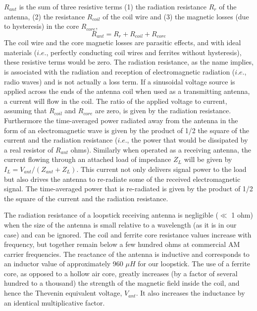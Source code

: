 \documentclass[utf8]{article}
\begin{document}
{	$R_{ant}$ is the sum of three resistive terms (1) the radiation resistance $R_r$ of the antenna, (2) the resistance $R_{coil}$ of the coil wire and (3) the magnetic losses (due to hysteresis) in the core $R_{core}$,
	$$R_{ant} = R_r + R_{coil} + R_{core}$$
	The coil wire and the core magnetic losses are parasitic effects, and with ideal materials ($i.e.$, perfectly conducting coil wires and ferrites without hysteresis), these resistive terms would be zero. The radiation resistance, as the name implies, is associated with the radiation and reception of electromagnetic radiation ($i.e.$, radio waves) and is not actually a loss term. If a sinusoidal voltage source is applied across the ends of the antenna coil when used as a transmitting antenna, a current will flow in the coil. The ratio of the applied voltage to current, assuming that $R_{coil}$ and $R_{core}$ are zero, is given by the radiation resistance. Furthermore the time-averaged power radiated away from the antenna in the form of an electromagnetic wave is given by the product of 1/2 the square of the current and the radiation resistance ($i.e.$, the power that would be dissipated by a real resistor of $R_{ant}$ ohms). Similarly when operated as a receiving antenna, the current flowing through an attached load of impedance $Z_L$ will be given by $I_L = V_{ant}/(Z_{ant} +Z_L )$. This current not only delivers signal power to the load but also drives the antenna to re-radiate some of the received electromagnetic signal. The time-averaged power that is re-radiated is given by the product of 1/2 the square of the current and the radiation resistance.

	The radiation resistance of a loopstick receiving antenna is negligible ($\ll$ 1 ohm) when the size of the antenna is small relative to a wavelength (as it is in our case) and can be ignored. The coil and ferrite core resistance values increase with frequency, but together remain below a few hundred ohms at commercial AM carrier frequencies. The reactance of the antenna is inductive and corresponds to an inductor value of approximately 960 $\mu H$ for our loopstick. The use of a ferrite core, as opposed to a hollow air core, greatly increases (by a factor of several hundred to a thousand) the strength of the magnetic field inside the coil, and hence the Thevenin equivalent voltage, $V_{ant}$. It also increases the inductance by an identical multiplicative factor.

}
\end{document}
